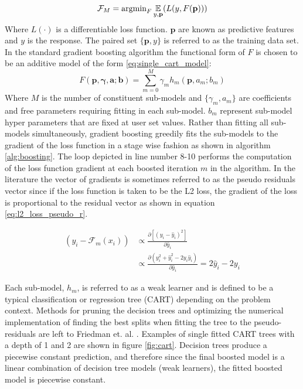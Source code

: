 \begin{equation}
\mathcal F_M = \text{argmin}_F \operatorname*{\mathbb{E}}_{y, \mathbf p} (L(y, F(\mathbf p)))
\end{equation}
Where $L(\cdot)$ is a differentiable loss function.  $\mathbf p$ are known as predictive features and $y$ is the response.  The paired set $\{\mathbf p, y \}$ is referred to as the training data set.  In the standard gradient boosting algorithm the functional form of $F$ is chosen to be an additive model of the form \ref{eq:single_cart_model}:
\begin{equation}
F(\mathbf p, \mathbf{\gamma}, \mathbf a; \mathbf b) = \sum_{m=0}^M \gamma_m h_m(\mathbf p, a_m; b_m)
\label{eq:single_cart_model}
\end{equation} 
Where $M$ is the number of constituent sub-models and $\{\gamma_m, a_m\}$ are coefficients and free parameters requiring fitting in each sub-model.  $b_m$ represent sub-model hyper parameters that are fixed at user set values.
Rather than fitting all sub-models simultaneously, 
gradient boosting greedily fits the sub-models to the gradient of the loss function in a stage wise fashion as shown in algorithm \ref{alg:boosting}.  The loop depicted in line number 8-10 performs the computation of the loss function gradient at each boosted iteration $m$ in the algorithm.  In the literature the vector of gradients is sometimes referred to as the pseudo residuals vector since if the loss function is taken to be the L2 loss, the gradient of the loss is proportional to the residual vector as shown in equation \ref{eq:l2_loss_pseudo_r}.

\begin{align}
    (y_i - \mathcal F_{m}(x_i)) & \propto \frac{\partial [(y_i - \hat y_i)^2]}{\partial \hat y_i} \nonumber \\
     & \propto \frac{\partial (y_i^2 + \hat y_i^2 - 2y_i \hat y_i)}{\partial \hat y_i} = 2 \hat y_i - 2 y_i
    \label{eq:l2_loss_pseudo_r}
\end{align}

Each sub-model, $h_m$, is referred to as a weak learner and is defined to be a typical classification or regression tree (CART) depending on the problem context.  Methods for pruning the decision trees and optimizing the numerical implementation of finding the best splits when fitting the tree to the pseudo-residuals are left to Friedman et. al. \cite{friedman2002}.  Examples of single fitted CART trees with a depth of 1 and 2 are shown in figure \ref{fig:cart}.  Decision trees produce a piecewise constant prediction, and therefore since the final boosted model is a linear combination of decision tree models (weak learners), the fitted boosted model is piecewise constant.  

